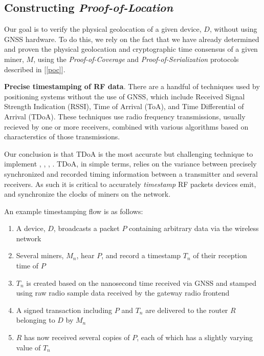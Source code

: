 \documentclass[10pt, nonatbib, nocopyrightspace, reprint]{sigplanconf}
\newcommand{\secref}[1]{[\autoref{#1}]}
\begin{document}
\subsection{Constructing \emph{Proof-of-Location}}

Our goal is to verify the physical geolocation of a given device, $D$, without using GNSS hardware. To do this, we rely on the fact that we have already determined and proven the physical geolocation and cryptographic time consensus of a given miner, $M$, using the \emph{Proof-of-Coverage} and \emph{Proof-of-Serialization} protocols described in \secref{poc}.

\textbf{Precise timestamping of RF data}. There are a handful of techniques used by positioning systems without the use of GNSS, which include Received Signal Strength Indication (RSSI), Time of Arrival (ToA), and Time Differential of Arrival (TDoA). These techniques use radio frequency transmissions, usually recieved by one or more receivers, combined with various algorithms based on characterstics of those transmissions.

Our conclusion is that TDoA is the most accurate but challenging technique to implement \cite{tdoavsrssi}, \cite{tdoavstoa}, \cite{wifipositioning}, \cite{locationestimation}. TDoA, in simple terms, relies on the variance between precisely synchronized and recorded timing information between a transmitter and several receivers. As such it is critical to accurately \emph{timestamp} RF packets devices emit, and synchronize the clocks of miners on the network.

An example timestamping flow is as follows:

\begin{enumerate}
  \item A device, $D$, broadcasts a packet $P$ containing arbitrary data via the wireless network
  \item Several miners, $M_n$, hear $P$, and record a timestamp $T_n$ of their reception time of $P$
  \item $T_n$ is created based on the nanosecond time received via GNSS and stamped using raw radio sample data received by the gateway radio frontend
  \item A signed transaction including $P$ and $T_n$ are delivered to the router $R$ belonging to $D$ by $M_n$
  \item $R$ has now received several copies of $P$, each of which has a slightly varying value of $T_n$
\end{enumerate}
\end{document}
